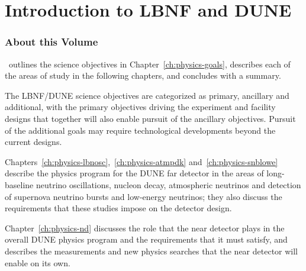 
\chapter{Introduction to LBNF and DUNE}
\label{ch:physics-overview}



\subsection{About this Volume}

\volphys\, outlines the science objectives in
Chapter~\ref{ch:physics-goals}, describes each of the areas of study in the following
chapters, and concludes with a summary.

The LBNF/DUNE science objectives are categorized as primary, ancillary and additional, 
with the primary objectives driving the experiment and facility designs that together will 
also enable pursuit of the ancillary objectives. 
Pursuit of the additional goals may require technological developments beyond the current designs.

Chapters~\ref{ch:physics-lbnosc},~\ref{ch:physics-atmpdk} and~\ref{ch:physics-snblowe}
describe the physics program for the DUNE far detector in the areas of long-baseline neutrino
oscillations, nucleon decay, atmospheric neutrinos and detection of supernova neutrino
bursts and low-energy neutrinos; they also discuss the requirements that these studies 
impose on the detector design.

Chapter~\ref{ch:physics-nd} discusses the role that the near detector plays in the overall DUNE
physics program and the requirements that it must satisfy, and describes the measurements and 
new physics searches that the near detector will enable on its own.



